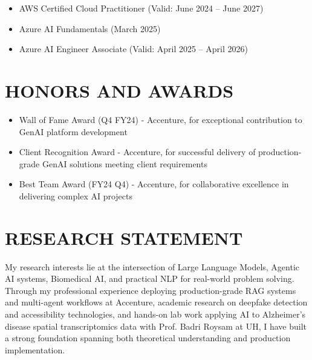 \documentclass[11pt,a4paper]{article}
\newcommand{\CVItem}[1]{\item{#1}}
\newcommand{\CVSubheading}[4]{
  \vspace{2pt}
  \textbf{#1} \hfill #2 \\
  \textit{#3} \hfill \textit{#4}
  \vspace{3pt}
}
\begin{document}
\begin{itemize}
    \CVItem{AWS Certified Cloud Practitioner (Valid: June 2024 -- June 2027)}
    \CVItem{Azure AI Fundamentals (March 2025)}
    \CVItem{Azure AI Engineer Associate (Valid: April 2025 -- April 2026)}
\end{itemize}




\section{HONORS AND AWARDS}

\begin{itemize}
    \CVItem{Wall of Fame Award (Q4 FY24) - Accenture, for exceptional contribution to GenAI platform development}
    \CVItem{Client Recognition Award - Accenture, for successful delivery of production-grade GenAI solutions meeting client requirements}
    \CVItem{Best Team Award (FY24 Q4) - Accenture, for collaborative excellence in delivering complex AI projects}
\end{itemize}

\section{RESEARCH STATEMENT}

My research interests lie at the intersection of Large Language Models, Agentic AI systems, Biomedical AI, and practical NLP for real-world problem solving. Through my professional experience deploying production-grade RAG systems and multi-agent workflows at Accenture, academic research on deepfake detection and accessibility technologies, and hands-on lab work applying AI to Alzheimer's disease spatial transcriptomics data with Prof. Badri Roysam at UH, I have built a strong foundation spanning both theoretical understanding and production implementation.
\end{document}
